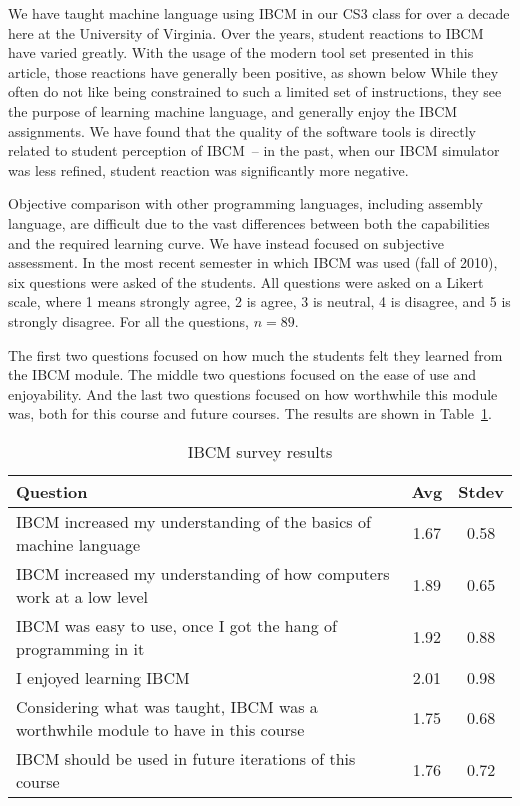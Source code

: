 We have taught machine language using IBCM in our CS3 class for over a
decade here at the University of Virginia.  Over the years, student
reactions to IBCM have varied greatly.  With the usage of the modern
tool set presented in this article, those reactions have generally
been positive, as shown below While they often do not like being
constrained to such a limited set of instructions, they see the
purpose of learning machine language, and generally enjoy the IBCM
assignments.  We have found that the quality of the software tools is
directly related to student perception of IBCM~-- in the past, when
our IBCM simulator was less refined, student reaction was
significantly more negative.

Objective comparison with other programming languages, including
assembly language, are difficult due to the vast differences between
both the capabilities and the required learning curve.  We have
instead focused on subjective assessment.  In the most recent semester
in which IBCM was used (fall of 2010), six questions were asked of the
students.  All questions were asked on a Likert scale, where 1 means
strongly agree, 2 is agree, 3 is neutral, 4 is disagree, and 5 is
strongly disagree.  For all the questions, $n=89$.

The first two questions focused on how much the students felt they
learned from the IBCM module.  The middle two questions focused on the
ease of use and enjoyability.  And the last two questions focused on
how worthwhile this module was, both for this course and future courses.
The results are shown in Table~\ref{IBCM-survey-results.tbl}.

\begin{table}[h]
\centering
\begin{tabular}{|p{5in}|c|c|}  \hline
\bf Question & \bf Avg & \bf Stdev \\ \hline \hline
IBCM increased my understanding of the basics of machine language &
1.67 & 0.58 \\ \hline
IBCM increased my understanding of how computers work at a low level &
1.89 & 0.65 \\ \hline
IBCM was easy to use, once I got the hang of programming in it & 1.92
& 0.88 \\ \hline
I enjoyed learning IBCM & 2.01 & 0.98 \\ \hline
Considering what was taught, IBCM was a worthwhile module to have in
this course & 1.75 & 0.68 \\ \hline
IBCM should be used in future iterations of this course & 1.76 & 0.72
\\ \hline
\end{tabular}
\caption{IBCM survey results}
\label{IBCM-survey-results.tbl}
\end{table}

